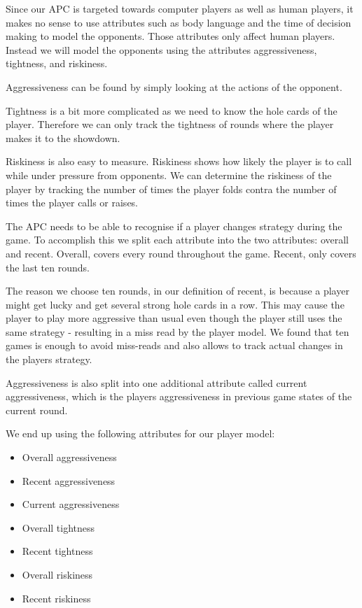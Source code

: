 Since our APC is targeted towards computer players as well as human players, it makes no sense to use attributes such as body language and the time of decision making to model the opponents. Those attributes only affect human players. Instead we will model the opponents using the attributes aggressiveness, tightness, and riskiness.

Aggressiveness can be found by simply looking at the actions of the opponent. 

Tightness is a bit more complicated as we need to know the hole cards of the player. Therefore we can only track the tightness of rounds where the player makes it to the showdown.

Riskiness is also easy to measure. Riskiness shows how likely the player is to call while under pressure from opponents. We can determine the riskiness of the player by tracking the number of times the player folds contra the number of times the player calls or raises.

The APC needs to be able to recognise if a player changes strategy during the game. To accomplish this we split each attribute into the two attributes: overall and recent. Overall, covers every round throughout the game. Recent, only covers the last ten rounds.

The reason we choose ten rounds, in our definition of recent, is because a player might get lucky and get several strong hole cards in a row. This may cause the player to play more aggressive than usual even though the player still uses the same strategy - resulting in a miss read by the player model. We found that ten games is enough to avoid miss-reads and also allows to track actual changes in the players strategy.

Aggressiveness is also split into one additional attribute called current aggressiveness, which is the players aggressiveness in previous game states of the current round.

We end up using the following attributes for our player model:
\begin{itemize}
\item Overall aggressiveness
\item Recent aggressiveness
\item Current aggressiveness
\item Overall tightness
\item Recent tightness
\item Overall riskiness
\item Recent riskiness
\end{itemize}

